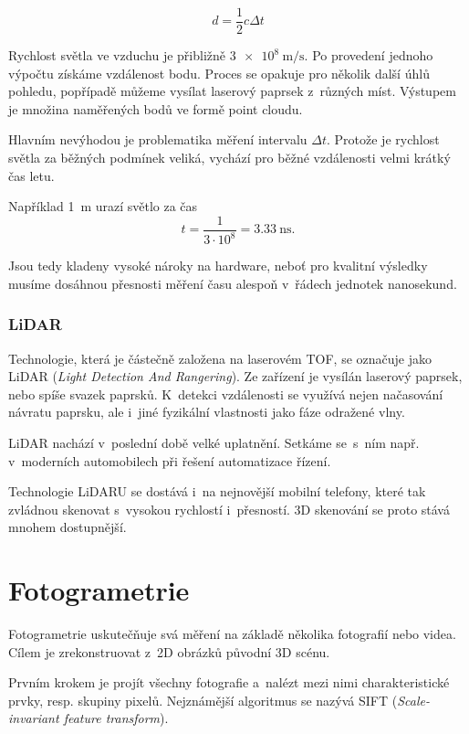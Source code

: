 \documentclass[12pt]{report}			%
\begin{document}
    			    $$ d=\frac{1}{2}c\Delta t$$
    
    			    Rychlost světla ve vzduchu je přibližně $\SI{3e8}{\meter\per\second}$. Po provedení jednoho výpočtu získáme vzdálenost bodu. Proces se opakuje pro několik další úhlů pohledu, popřípadě můžeme vysílat laserový paprsek z~různých míst. Výstupem je množina naměřených bodů ve formě point cloudu. \cite{tof}
    
    			    Hlavním nevýhodou je problematika měření intervalu $\Delta t$. Protože je rychlost světla za běžných podmínek veliká, vychází pro běžné vzdálenosti velmi krátký čas letu. \cite{tof}
    
    			    Například \SI{1}{\meter} urazí světlo za čas
    			    $$ t=\frac{1}{3\cdot 10^8}=\SI{3,33}{\nano\second}.$$
    
    			    Jsou tedy kladeny vysoké nároky na hardware, neboť pro kvalitní výsledky musíme dosáhnou přesnosti měření času alespoň v~řádech jednotek nanosekund.


                    \subsubsection{LiDAR}
                        Technologie, která je částečně založena na laserovém TOF, se označuje jako LiDAR (\emph{Light Detection And Rangering}). Ze zařízení je vysílán laserový paprsek, nebo spíše svazek paprsků. K~detekci vzdálenosti se využívá nejen načasování návratu paprsku, ale i~jiné fyzikální vlastnosti jako fáze odražené vlny. \cite{lidarVStof}\cite{lidarANDtof}
        
                        LiDAR nachází v~poslední době velké uplatnění. Setkáme se~s~ním např. v~moderních automobilech při řešení automatizace řízení. \cite{lidarANDtof}
        
                        Technologie LiDARU se dostává i~na nejnovější mobilní telefony, které tak zvládnou skenovat s~vysokou rychlostí i~přesností. 3D skenování se proto stává mnohem dostupnější.\cite{lidarVStof}


			\section{Fotogrametrie}
                Fotogrametrie uskutečňuje svá měření na základě několika fotografií nebo videa. Cílem je zrekonstruovat z~2D obrázků původní 3D scénu. \cite{alicevision}

                Prvním krokem je projít všechny fotografie a~nalézt mezi nimi charakteristické prvky, resp. skupiny pixelů. Nejznámější algoritmus se nazývá SIFT (\emph{Scale-invariant feature transform}).\cite{naturalfeatureextraction}
\end{document}
